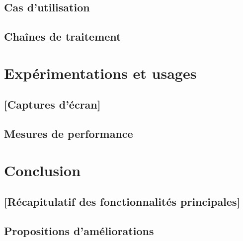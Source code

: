 \documentclass[a4paper, 11pt]{report}
\begin{document}
\section{Cas d'utilisation}

\section{Chaînes de traitement}


\chapter{Expérimentations et usages}

\section{[Captures d'écran]}

\section{Mesures de performance}


\chapter{Conclusion}

\section{[Récapitulatif des fonctionnalités principales]}

\section{Propositions d'améliorations}



\end{document}
